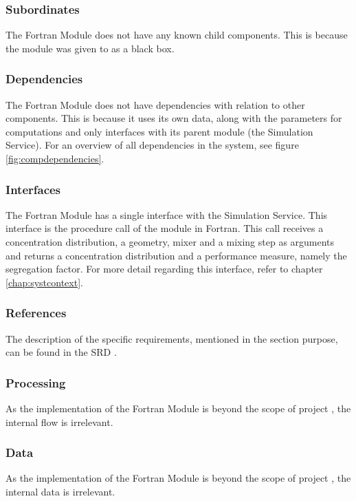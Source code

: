 \subsubsection*{Subordinates}
The Fortran Module does not have any known child components. This is because the module was given to \projectauthor{} as a black box.

\subsubsection*{Dependencies}
The Fortran Module does not have dependencies with relation to other components. This is because it uses its own data, along with the parameters for computations and only interfaces with its parent module (the Simulation Service). For an overview of all dependencies in the system, see figure \ref{fig:compdependencies}.

\subsubsection*{Interfaces}
The Fortran Module has a single interface with the Simulation Service. This interface is the procedure call of the module in Fortran. This call receives a concentration distribution, a geometry, mixer and a mixing step as arguments and returns a concentration distribution and a performance measure, namely the segregation factor. For more detail regarding this interface, refer to chapter \ref{chap:systcontext}.

\subsubsection*{References}
The description of the specific requirements, mentioned in the section purpose, can be found in the SRD \cite{srd}.

\subsubsection*{Processing}
As the implementation of the Fortran Module is beyond the scope of project \projectname{}, the internal flow is irrelevant.

\subsubsection*{Data}
As the implementation of the Fortran Module is beyond the scope of project \projectname{}, the internal data is irrelevant.

